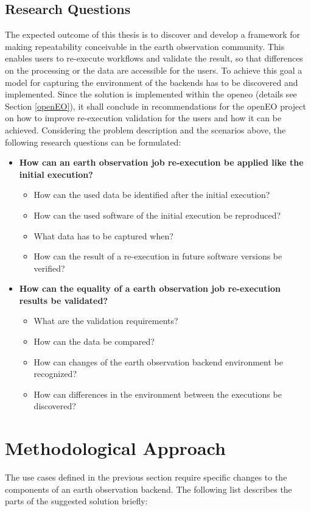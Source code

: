 \documentclass[draft,final]{vutinfth} %
\begin{document}
\subsection{Research Questions}\label{research question}

The expected outcome of this thesis is to discover and develop a framework for making repeatability conceivable in the earth observation community. This enables users to re-execute workflows and validate the result, so that differences on the processing or the data are accessible for the users. To achieve this goal a model for capturing the environment of the backends has to be discovered and implemented. Since the solution is implemented within the \gls{openeo} (details see Section \ref{openEO}), it shall conclude in recommendations for the openEO project on how to improve re-execution validation for the users and how it can be achieved. Considering the problem description and the scenarios above, the following research questions can be formulated:

\begin{itemize}
	\item \textbf{How can an earth observation job re-execution be applied like the initial execution?}
	\begin{itemize}
		\item How can the used data be identified after the initial execution?
		\item How can the used software of the initial execution be reproduced?
		\item What data has to be captured when?
		\item How can the result of a re-execution in future software versions be verified?
	\end{itemize}
	\item \textbf{How can the equality of a earth observation job re-execution results be validated?}
	\begin{itemize}
		\item What are the validation requirements?
		\item How can the data be compared?
		\item How can changes of the earth observation backend environment be recognized?
		\item How can differences in the environment between the executions be discovered?
	\end{itemize}
\end{itemize}

\section{Methodological Approach}\label{Method}
The use cases defined in the previous section require specific changes to the components of an earth observation backend. The following list describes the parts of the suggested solution briefly: 
\end{document}
